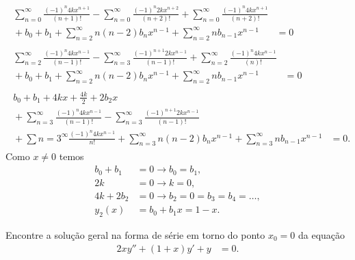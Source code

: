 \documentclass[a4paper,12pt, leqno, answers]{exam}
\begin{document}
\begin{questions}
\begin{solution}
\begin{align*}
            \begin{split}
                \sum_{n = 0}^\infty \frac{\left( -1 \right)^n 4 k x^{n + 1}}{\left( n + 1 \right)!} - \sum_{n = 0}^\infty \frac{\left( -1 \right)^n 2 k x^{n + 2}}{\left( n + 2 \right)!} + \sum_{n = 0}^\infty \frac{\left( -1 \right)^n 4 k x^{n + 1}}{\left( n + 2 \right)!} \\ {}+ b_0 + b_1 + \sum_{n = 2}^\infty n \left( n - 2 \right) b_n x^{n - 1} + \sum_{n = 2}^\infty n b_{n - 1} x^{n - 1} &= 0
            \end{split} \\
            \begin{split}
                \sum_{n = 2}^\infty \frac{\left( -1 \right)^n 4 k x^{n - 1}}{\left( n - 1 \right)!} - \sum_{n = 3}^\infty \frac{\left( -1 \right)^{n + 1} 2 k x^{n - 1}}{\left( n - 1 \right)!} + \sum_{n = 2}^\infty \frac{\left( -1 \right)^n 4 k x^{n - 1}}{\left( n \right)!} \\ {}+ b_0 + b_1 + \sum_{n = 2}^\infty n \left( n - 2 \right) b_n x^{n - 1} + \sum_{n = 2}^\infty n b_{n - 1} x^{n - 1} &= 0
            \end{split} \\
            \begin{split}
                b_0 + b_1 + 4 k x + \frac{4 k }{2} + 2 b_2 x \\ {}+ \sum_{n = 3}^\infty \frac{\left( -1 \right)^n 4 k x^{n - 1}}{\left( n - 1 \right)!} - \sum_{n = 3}^\infty \frac{\left( -1 \right)^{n + 1} 2 k x^{n -1}}{\left( n - 1 \right)!} \\ {}+ \sum{n = 3}^\infty \frac{\left( -1 \right)^n 4 k x^{n - 1}}{n!} + \sum_{n = 3}^\infty n \left( n - 2 \right) b_n x^{n - 1} + \sum_{n = 3}^\infty n b_{n - 1} x^{n - 1} &= 0.
            \end{split}
        \end{align*}
        Como $x \neq 0$ temos
        \begin{align*}
            b_0 + b_1 &= 0 \rightarrow b_0 = b_1, \\
            2 k &= 0 \rightarrow k = 0, \\
            4 k + 2 b_2 &= 0 \rightarrow b_2 = 0 = b_3 = b_4 = \ldots, \\
            y_2(x) &= b_0 + b_1 x = 1 - x.
        \end{align*}
    \end{solution}

    \question[P1 de 2006] Encontre a solu\c{c}\~{a}o geral na forma de s\'{e}rie em torno do ponto $x_0 = 0$ da equa\c{c}\~{a}o
    \begin{align*}
        2 x y'' + (1 + x) y' + y &= 0.
    \end{align*}
    \begin{solution}
    \end{solution}


\end{questions}
\end{document}
